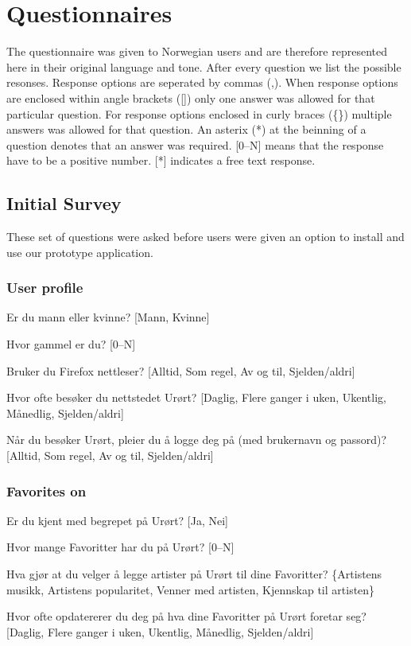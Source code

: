 \chapter{Questionnaires}
\label{appendix:questionnaire}

The questionnaire was given to Norwegian users and are therefore represented
here in their original language and tone. After every question we list the
possible resonses. Response options are seperated by commas (,). When response
options are enclosed within angle brackets ([]) only one answer was allowed
for that particular question. For response options enclosed in curly braces
(\{\}) multiple answers was allowed for that question. An asterix (*) at the
beinning of a question denotes that an answer was required. [0--N] means that
the response have to be a positive number. [*] indicates a free text response.

\section{Initial Survey}

These set of questions were asked before users were given an option to install
and use our prototype application.

\subsection{User profile}

\begin{enum}
  \item Er du mann eller kvinne?
    [Mann, Kvinne]
  \item Hvor gammel er du?
    [0--N]
  \item * Bruker du Firefox nettleser?
    [Alltid, Som regel, Av og til, Sjelden/aldri]
  \item * Hvor ofte besøker du nettstedet Urørt?
    [Daglig, Flere ganger i uken, Ukentlig, Månedlig, Sjelden/aldri]
  \item * Når du besøker Urørt, pleier du å logge deg på (med brukernavn
    og passord)?
    [Alltid, Som regel, Av og til, Sjelden/aldri]
\end{enum}

\subsection{Favorites on \urort{}}

\begin{enum}
  \item * Er du kjent med begrepet  på Urørt?
    [Ja, Nei]
  \item Hvor mange Favoritter har du på Urørt?
    [0--N]
  \item Hva gjør at du velger å legge artister på Urørt til dine Favoritter?
    \{Artistens musikk, Artistens popularitet, Venner med artisten,
    Kjennskap til artisten\}
  \item  Hvor ofte opdatererer du deg på hva dine Favoritter på Urørt
    foretar seg?
    [Daglig, Flere ganger i uken, Ukentlig, Månedlig, Sjelden/aldri]
\end{enum}

